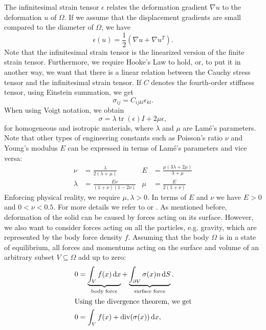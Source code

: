 \documentclass[a4paper, 11pt, twoside]{article}
\theoremstyle{plain}
\theoremstyle{definition}
\DeclareMathOperator\tr{tr}
\DeclareMathOperator\Div{div}
\newcommand{\dd}{\,\mathrm{d}}
\begin{document}
The infinitesimal strain tensor $\epsilon$ relates the deformation gradient $\nabla u$ to the deformation $u$ of $\Omega$.
If we assume that the displacement gradients are small compared to the diameter of $\Omega$, we have
\begin{equation}
 \epsilon(u) = \frac{1}{2} \left( \nabla u + \nabla u ^ T \right). 
\end{equation}
Note that the infinitesimal strain tensor is the linearized version of the finite strain tensor.
Furthermore, we require Hooke's Law to hold, or, to put it in another way, we want that there is a linear relation between the Cauchy stress tensor and the infinitesimal strain tensor.
If $C$ denotes the fourth-order stiffness tensor, using Einstein summation, we get
\begin{equation}
 \sigma_{ij} = C_{ijkl} \epsilon_{kl}.
\end{equation}
When using Voigt notation, we obtain
\begin{equation}
 \sigma = \lambda \tr(\epsilon) I + 2 \mu \epsilon, 
 \label{eq:CauchyStressLinear}
\end{equation}
for homogeneous and isotropic materials, where $\lambda$ and $\mu$ are Lam\'{e}'s parameters.
Note that other types of engineering constants such as Poisson's ratio $\nu$ and Young's modulus $E$ can be expressed in terms of Lam\'{e}'s parameters and vice versa:
\begin{align*}
 \nu &= \frac{\lambda}{2(\lambda + \mu)}  & E &= \frac{\mu (3 \lambda + 2 \mu)}{\lambda + \mu}  \\
 \lambda &= \frac{E \nu}{(1+\nu)(1-2\nu)} & \mu &= \frac{E}{2(1+\nu)} 
\end{align*}
Enforcing physical reality, we require $\mu,\lambda > 0$.
In terms of $E$ and $\nu$ we have $E > 0$ and $0 < \nu < 0.5$.
For more details we refer to \cite{braess} or \cite{rannacher}.
As mentioned before, deformation of the solid can be caused by forces acting on its surface.
However, we also want to consider forces acting on all the particles, e.g. gravity, which are represented by the body force density $f$.
Assuming that the body $\Omega$ is in a state of equilibrium, all forces and momentums acting on the surface and volume of an arbitrary subset $V \subseteq \Omega$ add up to zero:
\begin{align}
 0 &= \underbrace{\int_{V} f(x) \dd x}_{\text{body force}}  + \underbrace{\int_{\partial V} \sigma(x) n \dd S}_{\text{surface force}}. \\
 \intertext{Using the divergence theorem, we get}
 0 &= \int_{V} f(x) + \Div(\sigma(x)) \dd x ,
\end{align}
\end{document}
